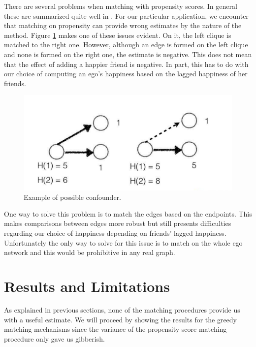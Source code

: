 \documentclass[11pt]{article}
\begin{document}
There are several problems when matching with propensity scores. In general these are summarized quite well in \cite{king2007politically}. For our particular application, we encounter that matching on propensity can provide wrong estimates by the nature of the method. Figure \ref{fig:treatment} makes one of these issues evident. On it, the left clique is matched to the right one. However, although an edge is formed on the left clique and none is formed on the right one, the estimate is negative. This does not mean that the effect of adding a happier friend is negative. In part, this has to do with our choice of computing an ego’s happiness based on the lagged happiness of her friends.\\

\begin{figure}[h]
\centering
\includegraphics[scale=.3]{graph}
\caption{Example of possible confounder.}
\label{fig:treatment}
\end{figure}

One way to solve this problem is to match the edges based on the endpoints. This makes comparisons between edges more robust but still presents difficulties regarding our choice of happiness depending on friends' lagged happiness. Unfortunately the only way to solve for this issue is to match on the whole ego network and this would be prohibitive in any real graph.


\section{Results and Limitations}
\label{Results}

As explained in previous sections, none of the matching procedures provide us with a useful estimate. We will proceed by showing the results for the greedy matching mechanisms since the variance of the propensity score matching procedure only gave us gibberish.\\
\end{document}
